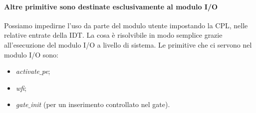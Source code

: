 \paragraph{Altre primitive sono destinate esclusivamente al modulo I/O}  Possiamo impedirne l'uso da parte del modulo utente impostando la CPL, nelle relative entrate della IDT. La cosa è risolvibile in modo semplice grazie all'esecuzione del modulo I/O a livello di sistema. Le primitive che ci servono nel modulo I/O sono:
\begin{itemize}
	\item \emph{activate$\_$pe};
	\item \emph{wfi};
	\item \emph{gate$\_$init} (per un inserimento controllato nel gate).
\end{itemize}
\clearpage

